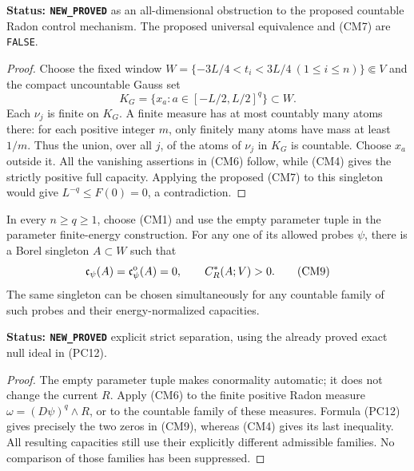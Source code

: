\noindent\textbf{Status: \texttt{NEW\_PROVED}} as an
all-dimensional obstruction to the proposed countable Radon
control mechanism. The proposed universal equivalence and (CM7)
are \texttt{FALSE}.

\begin{proof}
Choose the fixed window
$W=\{-3L/4<t_i<3L/4\ (1\leq i\leq n)\}\Subset V$
and the compact uncountable Gauss set
\[
                    K_G=\{x_a:a\in[-L/2,L/2]^q\}\subset W.
 \tag{CM8}
\]
Each $\nu_j$ is finite on $K_G$. A finite measure has at most
countably many atoms there: for each positive integer $m$, only
finitely many atoms have mass at least $1/m$. Thus the union,
over all $j$, of the atoms of $\nu_j$ in $K_G$ is countable.
Choose $x_a$ outside it. All the vanishing assertions in (CM6)
follow, while (CM4) gives the strictly positive full capacity.
Applying the proposed (CM7) to this singleton would give
$L^{-q}\leq F(0)=0$, a contradiction.
\end{proof}

\begin{corollary}
\label{cor:r12-parameter-capacity-strict-null-ideal}
In every $n\geq q\geq1$, choose (CM1) and use the empty parameter
tuple in the parameter finite-energy construction. For any one of
its allowed probes $\psi$, there is a Borel singleton $A\subset W$
such that
\[
                  \mathfrak c_\psi(A)
                    =\mathfrak c_\psi^{\rm o}(A)=0,
                         \qquad C_R^*(A;V)>0.
 \tag{CM9}
\]
The same singleton can be chosen simultaneously for any countable
family of such probes and their energy-normalized capacities.
\end{corollary}

\noindent\textbf{Status: \texttt{NEW\_PROVED}} explicit
strict separation, using the already proved exact null ideal
in (PC12).

\begin{proof}
The empty parameter tuple makes conormality automatic; it does
not change the current $R$. Apply (CM6) to the finite positive
Radon measure $\omega=(D\psi)^q\wedge R$, or to the countable
family of these measures. Formula (PC12) gives precisely the
two zeros in (CM9), whereas (CM4) gives its last inequality.
All resulting capacities still use their explicitly different
admissible families. No comparison of those families has been
suppressed.
\end{proof}


